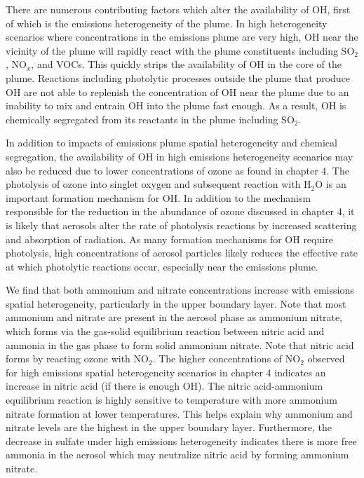 There are numerous contributing factors which alter the availability of OH, first of which is the emissions heterogeneity of the plume. In high heterogeneity scenarios where concentrations in the emissions plume are very high, OH near the vicinity of the plume will rapidly react with the plume constituents including SO$_2$, NO$_x$, and VOCs. This quickly strips the availability of OH in the core of the plume. Reactions including photolytic processes outside the plume that produce OH are not able to replenish the concentration of OH near the plume due to an inability to mix and entrain OH into the plume fast enough. As a result, OH is chemically segregated from its reactants in the plume including SO$_2$. 

In addition to impacts of emissions plume spatial heterogeneity and chemical segregation, the availability of OH in high emissions heterogeneity scenarios may also be reduced due to lower concentrations of ozone as found in chapter 4. The photolysis of ozone into singlet oxygen and subsequent reaction with H$_2$O is an important formation mechanism for OH. In addition to the mechanism responsible for the reduction in the abundance of ozone discussed in chapter 4, it is likely that aerosols alter the rate of photolysis reactions by increased scattering and absorption of radiation. As many formation mechanisms for OH require photolysis, high concentrations of aerosol particles likely reduces the effective rate at which photolytic reactions occur, especially near the emissions plume. 

We find that both ammonium and nitrate concentrations increase with emissions spatial heterogeneity, particularly in the upper boundary layer.  Note that most ammonium and nitrate are present in the aerosol phase as ammonium nitrate, which forms via the gas-solid equilibrium reaction between nitric acid and ammonia in the gas phase to form solid ammonium nitrate. Note that nitric acid forms by reacting ozone with NO$_2$. The higher concentrations of NO$_2$ observed for high emissions spatial heterogeneity scenarios in chapter 4 indicates an increase in nitric acid (if there is enough OH). The nitric acid-ammonium equilibrium reaction is highly sensitive to temperature with more ammonium nitrate formation at lower temperatures. This helps explain why ammonium and nitrate levels are the highest in the upper boundary layer. Furthermore, the decrease in sulfate under high emissions heterogeneity indicates there is more free ammonia in the aerosol which may neutralize nitric acid by forming ammonium nitrate. 

